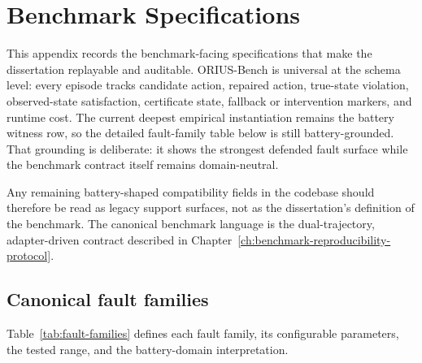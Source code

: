 \chapter{Benchmark Specifications}
\label{app:benchmark-specs}
\label{app:fault-specs}

This appendix records the benchmark-facing specifications that make the dissertation
replayable and auditable. ORIUS-Bench is universal at the schema level: every episode
tracks candidate action, repaired action, true-state violation, observed-state
satisfaction, certificate state, fallback or intervention markers, and runtime cost. The
current deepest empirical instantiation remains the battery witness row, so the detailed
fault-family table below is still battery-grounded. That grounding is deliberate: it shows
the strongest defended fault surface while the benchmark contract itself remains
domain-neutral.

Any remaining battery-shaped compatibility fields in the codebase should therefore be read
as legacy support surfaces, not as the dissertation's definition of the benchmark. The
canonical benchmark language is the dual-trajectory, adapter-driven contract described in
Chapter~\ref{ch:benchmark-reproducibility-protocol}.

\section{Canonical fault families}

Table~\ref{tab:fault-families} defines each fault family, its
configurable parameters, the tested range, and the battery-domain
interpretation.

